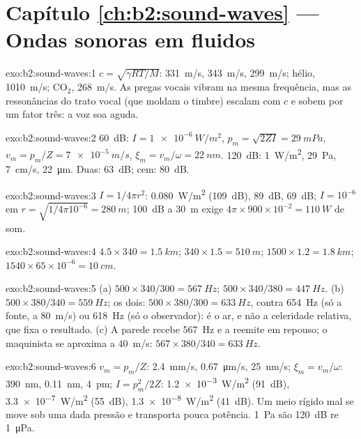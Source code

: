 \section*{Capítulo \ref{ch:b2:sound-waves} --- Ondas sonoras em fluidos}

\begin{solution}{exo:b2:sound-waves:1}
$c = \sqrt{\gamma RT/M}$: \qty{331}{m/s}, \qty{343}{m/s}, \qty{299}{m/s}; hélio,
\qty{1010}{m/s}; CO$_2$, \qty{268}{m/s}. As pregas vocais vibram na mesma
frequência, mas as ressonâncias do trato vocal (que moldam o
timbre) escalam com $c$ e sobem por um fator três: a voz soa
aguda.
\end{solution}

\begin{solution}{exo:b2:sound-waves:2}
\qty{60}{dB}: $I = \qty{1e-6}{W/m^2}$, $p_m = \sqrt{2ZI} = \qty{29}{mPa}$, $v_m = p_m/Z =
\qty{7e-5}{m/s}$, $\xi_m = v_m/\omega = \qty{22}{nm}$. \qty{120}{dB}: \qty{1}{W/m^2},
\qty{29}{Pa}, \qty{7}{cm/s}, \qty{22}{\micro m}. Duas: \qty{63}{dB}; cem: \qty{80}{dB}.
\end{solution}

\begin{solution}{exo:b2:sound-waves:3}
$I = 1/4\pi r^2$: \qty{0.080}{W/m^2} (\qty{109}{dB}), \qty{89}{dB}, \qty{69}{dB}; $I = 10^{-6}$
em $r = \sqrt{1/4\pi10^{-6}} = \qty{280}{m}$; \qty{100}{dB} a \qty{30}{m} exige $4\pi \times
900 \times 10^{-2} = \qty{110}{W}$ de som.
\end{solution}

\begin{solution}{exo:b2:sound-waves:4}
$4.5 \times 340 = \qty{1.5}{km}$; $340 \times 1.5 = \qty{510}{m}$; $1500 \times 1.2 = \qty{1.8}{km}$;
$1540 \times 65 \times 10^{-6} = \qty{10}{cm}$.
\end{solution}

\begin{solution}{exo:b2:sound-waves:5}
(a) $500 \times 340/300 = \qty{567}{Hz}$; $500 \times 340/380 = \qty{447}{Hz}$. (b) $500 \times
380/340 = \qty{559}{Hz}$; os dois: $500 \times 380/300 = \qty{633}{Hz}$, contra \qty{654}{Hz}
(só a fonte, a \qty{80}{m/s}) ou \qty{618}{Hz} (só o observador): é o ar, e não
a celeridade relativa, que fixa o resultado. (c) A parede recebe \qty{567}{Hz}
e a reemite em repouso; o maquinista se aproxima a \qty{40}{m/s}: $567 \times
380/340 = \qty{633}{Hz}$.
\end{solution}

\begin{solution}{exo:b2:sound-waves:6}
$v_m = p_m/Z$: \qty{2.4}{mm/s}, \qty{0.67}{\micro m/s}, \qty{25}{nm/s}; $\xi_m = v_m/\omega$:
\qty{390}{nm}, \qty{0.11}{nm}, \qty{4}{pm}; $I = p_m^2/2Z$: \qty{1.2e-3}{W/m^2} (\qty{91}{dB}),
\qty{3.3e-7}{W/m^2} (\qty{55}{dB}), \qty{1.3e-8}{W/m^2} (\qty{41}{dB}). Um meio rígido
mal se move sob uma dada pressão e transporta pouca potência.
\qty{1}{Pa} são \qty{120}{dB} re \qty{1}{\micro Pa}.
\end{solution}

